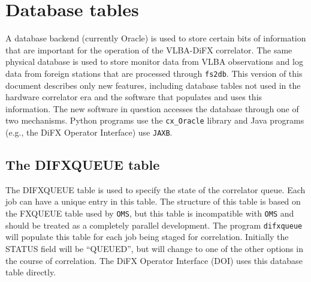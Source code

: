 \section{Database tables} \label{sec:database}

\vspace{-20pt}\hspace{145pt}
\difxonefive

\vspace{7pt}

A database backend (currently Oracle) is used to store certain bits of information that are important for the operation of the VLBA-DiFX correlator.
The same physical database is used to store monitor data from VLBA observations and log data from foreign stations that are processed through {\tt fs2db}.
This version of this document describes only new features, including database tables not used in the hardware correlator era and the
software that populates and uses this information.
The new software in question accesses the database through one of two mechanisms.  
Python programs use the {\tt cx\_Oracle} library and Java programs (e.g., the DiFX Operator Interface) use {\tt JAXB}.

\subsection{The DIFXQUEUE table}

The DIFXQUEUE table is used to specify the state of the correlator queue.
Each job can have a unique entry in this table.
The structure of this table is based on the FXQUEUE table used by {\tt OMS}, but this table is incompatible with {\tt OMS} and should be treated as a completely parallel development.
The program {\tt difxqueue} will populate this table for each job being staged for correlation.
Initially the STATUS field will be ``QUEUED'', but will change to one of the other options in the course of correlation.
The DiFX Operator Interface (DOI) uses this database table directly.

